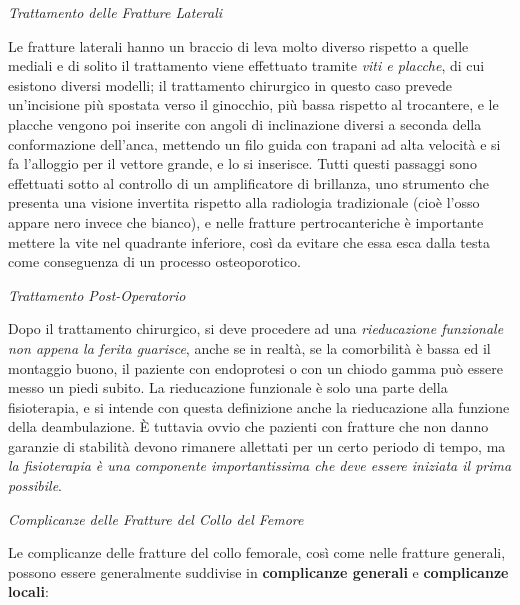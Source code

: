 \documentclass[]{article}
\begin{document}
\emph{Trattamento delle Fratture Laterali}

Le fratture laterali hanno un braccio di leva molto diverso rispetto a
quelle mediali e di solito il trattamento viene effettuato tramite
\emph{viti e placche}, di cui esistono diversi modelli; il trattamento
chirurgico in questo caso prevede un'incisione più spostata verso il
ginocchio, più bassa rispetto al trocantere, e le placche vengono poi
inserite con angoli di inclinazione diversi a seconda della
conformazione dell'anca, mettendo un filo guida con trapani ad alta
velocità e si fa l'alloggio per il vettore grande, e lo si inserisce.
Tutti questi passaggi sono effettuati sotto al controllo di un
amplificatore di brillanza, uno strumento che presenta una visione
invertita rispetto alla radiologia tradizionale (cioè l'osso appare nero
invece che bianco), e nelle fratture pertrocanteriche è importante
mettere la vite nel quadrante inferiore, così da evitare che essa esca
dalla testa come conseguenza di un processo osteoporotico.

\emph{Trattamento Post-Operatorio}

Dopo il trattamento chirurgico, si deve procedere ad una
\emph{rieducazione funzionale non appena la ferita guarisce}, anche se
in realtà, se la comorbilità è bassa ed il montaggio buono, il paziente
con endoprotesi o con un chiodo gamma può essere messo un piedi subito.
La rieducazione funzionale è solo una parte della fisioterapia, e si
intende con questa definizione anche la rieducazione alla funzione della
deambulazione. È tuttavia ovvio che pazienti con fratture che non danno
garanzie di stabilità devono rimanere allettati per un certo periodo di
tempo, ma \emph{la fisioterapia è una componente importantissima che
deve essere iniziata il prima possibile}.

\emph{Complicanze delle Fratture del Collo del Femore}

Le complicanze delle fratture del collo femorale, così come nelle
fratture generali, possono essere generalmente suddivise in
\textbf{complicanze generali} e \textbf{complicanze locali}:
\end{document}

